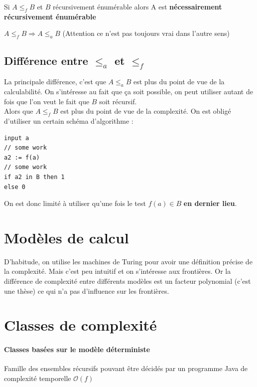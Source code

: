 \begin{myprop}
	Si $A \leq_f B$ et $B$ récursivement énumérable alors A est
	\textbf{nécessairement récursivement énumérable}
\end{myprop}

\begin{myprop}
	$A\leq_f B \Rightarrow A\leq_a B$ (Attention ce n'est pas toujours vrai
	dans l'autre sens)
\end{myprop}

\subsection{Différence entre $\leq_a$ et $\leq_f$}
La principale différence, c'est que $A \leq_a B$ est plus du point de vue de la
calculabilité. On s'intéresse au fait que ça soit possible, on peut utiliser
autant de fois que l'on veut le fait que $B$ soit récursif. \\
Alors que $A \leq_f B$ est plus du point de vue de la complexité. On est
obligé d'utiliser un certain schéma d'algorithme :

\begin{lstlisting}
input a
// some work
a2 := f(a)
// some work
if a2 in B then 1
else 0
\end{lstlisting}

On est donc limité à utiliser qu'une fois le test $f(a) \in B$ \textbf{en
	dernier lieu}.

\section{Modèles de calcul}
D'habitude, on utilise les machines de Turing pour avoir une définition précise
de la complexité. Mais c'est peu intuitif et on s'intéresse aux frontières. Or la
différence de complexité entre différents modèles est un facteur polynomial
(c'est une thèse) ce qui n'a pas d'influence sur les frontières.

\section{Classes de complexité}

\paragraph{Classes basées sur le modèle déterministe}
\begin{mydef}[DTIME(f)]
	Famille des ensembles récursifs pouvant être décidés par un programme
	Java de complexité temporelle $\mathcal{O}(f)$
\end{mydef}

